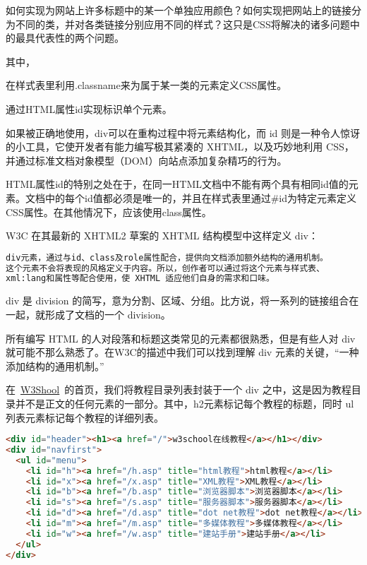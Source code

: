 如何实现为网站上许多标题中的某一个单独应用颜色？如何实现把网站上的链接分为不同的类，并对各类链接分别应用不同的样式？这只是CSS将解决的诸多问题中的最具代表性的两个问题。

其中，

\begin{compactitem}
\item 在样式表里利用.classname来为属于某一类的元素定义CSS属性。
\item 通过HTML属性id实现标识单个元素。
\end{compactitem}


如果被正确地使用，div可以在重构过程中将元素结构化，而 id 则是一种令人惊讶的小工具，它使开发者有能力编写极其紧凑的 XHTML，以及巧妙地利用 CSS，并通过标准文档对象模型（DOM）向站点添加复杂精巧的行为。

HTML属性id的特别之处在于，在同一HTML文档中不能有两个具有相同id值的元素。文档中的每个id值都必须是唯一的，并且在样式表里通过\#id为特定元素定义CSS属性。在其他情况下，应该使用class属性。


W3C 在其最新的 XHTML2 草案的 XHTML 结构模型中这样定义 div：

\begin{lstlisting}[language=HTML]
div元素，通过与id、class及role属性配合，提供向文档添加额外结构的通用机制。
这个元素不会将表现的风格定义于内容。所以，创作者可以通过将这个元素与样式表、
xml:lang和属性等配合使用，使 XHTML 适应他们自身的需求和口味。
\end{lstlisting}

div 是 division 的简写，意为分割、区域、分组。比方说，将一系列的链接组合在一起，就形成了文档的一个 division。

所有编写 HTML 的人对段落和标题这类常见的元素都很熟悉，但是有些人对 div 就可能不那么熟悉了。在W3C的描述中我们可以找到理解 div 元素的关键，``一种添加结构的通用机制。”

在~\href{http://www.w3school.com.cn/}{W3Shool}~的首页，我们将教程目录列表封装于一个 div 之中，这是因为教程目录并不是正文的任何元素的一部分。其中，h2元素标记每个教程的标题，同时 ul 列表元素标记每个教程的详细列表。

\begin{lstlisting}[language=HTML]
<div id="header"><h1><a href="/">w3school在线教程</a></h1></div>
<div id="navfirst">
  <ul id="menu">
    <li id="h"><a href="/h.asp" title="html教程">html教程</a></li>
    <li id="x"><a href="/x.asp" title="XML教程">XML教程</a></li>
    <li id="b"><a href="/b.asp" title="浏览器脚本">浏览器脚本</a></li>
    <li id="s"><a href="/s.asp" title="服务器脚本">服务器脚本</a></li>
    <li id="d"><a href="/d.asp" title="dot net教程">dot net教程</a></li>
    <li id="m"><a href="/m.asp" title="多媒体教程">多媒体教程</a></li>
    <li id="w"><a href="/w.asp" title="建站手册">建站手册</a></li>
  </ul>
</div>
\end{lstlisting}

